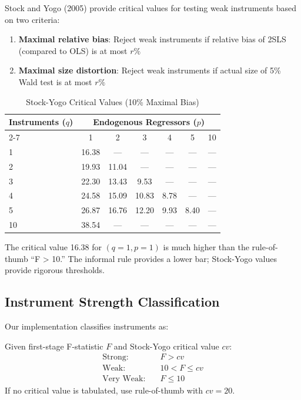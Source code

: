 Stock and Yogo (2005) provide critical values for testing weak instruments based on two criteria:

\begin{enumerate}
    \item \textbf{Maximal relative bias}: Reject weak instruments if relative bias of 2SLS (compared to OLS) is at most $r\%$
    \item \textbf{Maximal size distortion}: Reject weak instruments if actual size of 5\% Wald test is at most $r\%$
\end{enumerate}

\begin{table}[htbp]
\centering
\caption{Stock-Yogo Critical Values (10\% Maximal Bias)}
\label{tab:stock_yogo}
\begin{tabular}{lcccccc}
\toprule
Instruments ($q$) & \multicolumn{6}{c}{Endogenous Regressors ($p$)} \\
\cmidrule(lr){2-7}
& 1 & 2 & 3 & 4 & 5 & 10 \\
\midrule
1 & 16.38 & --- & --- & --- & --- & --- \\
2 & 19.93 & 11.04 & --- & --- & --- & --- \\
3 & 22.30 & 13.43 & 9.53 & --- & --- & --- \\
4 & 24.58 & 15.09 & 10.83 & 8.78 & --- & --- \\
5 & 26.87 & 16.76 & 12.20 & 9.93 & 8.40 & --- \\
10 & 38.54 & --- & --- & --- & --- & --- \\
\bottomrule
\end{tabular}
\end{table}

\begin{remark}
The critical value 16.38 for $(q=1, p=1)$ is much higher than the rule-of-thumb ``F > 10.'' The informal rule provides a lower bar; Stock-Yogo values provide rigorous thresholds.
\end{remark}

\subsection{Instrument Strength Classification}

Our implementation classifies instruments as:

\begin{definition}
\label{def:iv_strength}
Given first-stage F-statistic $F$ and Stock-Yogo critical value $cv$:
\begin{align*}
\text{Strong:} & \quad F > cv \\
\text{Weak:} & \quad 10 < F \leq cv \\
\text{Very Weak:} & \quad F \leq 10
\end{align*}
If no critical value is tabulated, use rule-of-thumb with $cv = 20$.
\end{definition}

